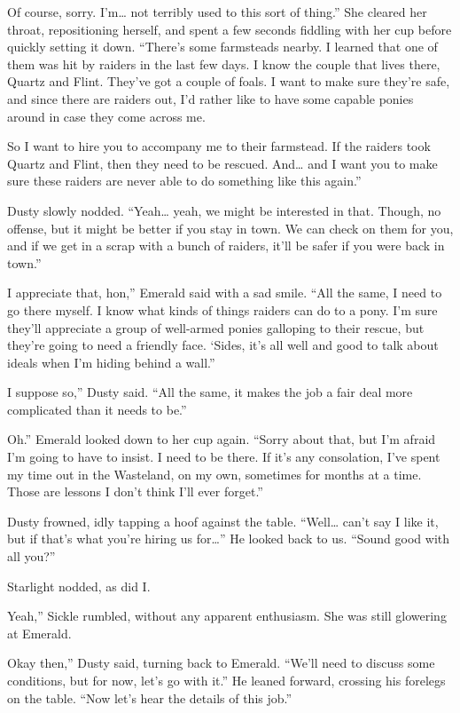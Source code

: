 \leavevmode{}Of course, sorry. I’m… not terribly used to this sort of thing.” She cleared her throat, repositioning herself, and spent a few seconds fiddling with her cup before quickly setting it down. “There’s some farmsteads nearby. I learned that one of them was hit by raiders in the last few days. I know the couple that lives there, Quartz and Flint. They’ve got a couple of foals. I want to make sure they’re safe, and since there are raiders out, I’d rather like to have some capable ponies around in case they come across me.

\leavevmode{}So I want to hire you to accompany me to their farmstead. If the raiders took Quartz and Flint, then they need to be rescued. And… and I want you to make sure these raiders are never able to do something like this again.”

Dusty slowly nodded. “Yeah… yeah, we might be interested in that. Though, no offense, but it might be better if you stay in town. We can check on them for you, and if we get in a scrap with a bunch of raiders, it’ll be safer if you were back in town.”

\leavevmode{}I appreciate that, hon,” Emerald said with a sad smile. “All the same, I need to go there myself. I know what kinds of things raiders can do to a pony. I’m sure they’ll appreciate a group of well-armed ponies galloping to their rescue, but they’re going to need a friendly face. ‘Sides, it’s all well and good to talk about ideals when I’m hiding behind a wall.”

\leavevmode{}I suppose so,” Dusty said. “All the same, it makes the job a fair deal more complicated than it needs to be.”

\leavevmode{}Oh.” Emerald looked down to her cup again. “Sorry about that, but I’m afraid I’m going to have to insist. I need to be there. If it’s any consolation, I’ve spent my time out in the Wasteland, on my own, sometimes for months at a time. Those are lessons I don’t think I’ll ever forget.”

Dusty frowned, idly tapping a hoof against the table. “Well… can’t say I like it, but if that’s what you’re hiring us for…” He looked back to us. “Sound good with all you?”

Starlight nodded, as did I.

\leavevmode{}Yeah,” Sickle rumbled, without any apparent enthusiasm. She was still glowering at Emerald.

\leavevmode{}Okay then,” Dusty said, turning back to Emerald. “We’ll need to discuss some conditions, but for now, let’s go with it.” He leaned forward, crossing his forelegs on the table. “Now let’s hear the details of this job.”

